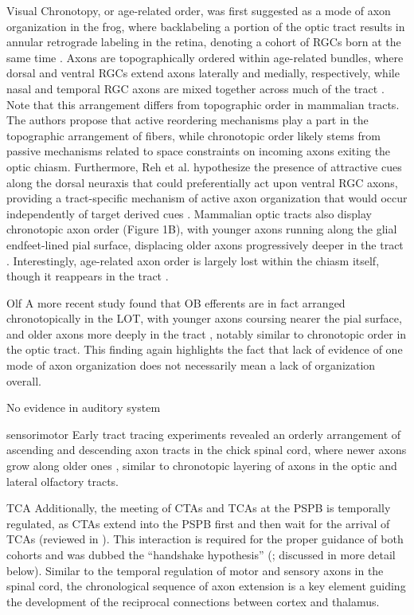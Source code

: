 Visual
Chronotopy, or age-related order, was first suggested as a mode of axon organization in the frog, where backlabeling a portion of the optic tract results in annular retrograde labeling in the retina, denoting a cohort of RGCs born at the same time \cite{fawcett1984fibre,reh1983organization}.
Axons are topographically ordered within age-related bundles, where dorsal and ventral RGCs extend axons laterally and medially, respectively, while nasal and temporal RGC axons are mixed together across much of the tract \cite{reh1983organization}.
Note that this arrangement differs from topographic order in mammalian tracts.
The authors propose that active reordering mechanisms play a part in the topographic arrangement of fibers, while chronotopic order likely stems from passive mechanisms related to space constraints on incoming axons exiting the optic chiasm.
Furthermore, Reh et al. hypothesize the presence of attractive cues along the dorsal neuraxis that could preferentially act upon ventral RGC axons, providing a tract-specific mechanism of active axon organization that would occur independently of target derived cues \cite{reh1983organization}.
Mammalian optic tracts also display chronotopic axon order (Figure 1B), with younger axons running along the glial endfeet-lined pial surface, displacing older axons progressively deeper in the tract \cite{colello1992observations,reese1987distributionrat,reese1990fibre,reese1997chronotopic,walsh1985age}. %
Interestingly, age-related axon order is largely lost within the chiasm itself, though it reappears in the tract \cite{colello1998changing}.

Olf
A more recent study found that OB efferents are in fact arranged chronotopically in the LOT, with younger axons coursing nearer the pial surface, and older axons more deeply in the tract \cite{yamatani2004chronotopic}, notably similar to chronotopic order in the optic tract.
This finding again highlights the fact that lack of evidence of one mode of axon organization does not necessarily mean a lack of organization overall.

No evidence in auditory system

sensorimotor
Early tract tracing experiments revealed an orderly arrangement of ascending and descending axon tracts in the chick spinal cord, where newer axons grow along older ones \cite{nornes1980pattern}, similar to chronotopic layering of axons in the optic and lateral olfactory tracts. 

TCA
Additionally, the meeting of CTAs and TCAs at the PSPB is temporally regulated, as CTAs extend into the PSPB first and then wait for the arrival of TCAs (reviewed in \cite{leyva2013and}). 
This interaction is required for the proper guidance of both cohorts and was dubbed the “handshake hypothesis” (\cite{molnar1995thalamic}; discussed in more detail below). 
Similar to the temporal regulation of motor and sensory axons in the spinal cord, the chronological sequence of axon extension is a key element guiding the development of the reciprocal connections between cortex and thalamus. 
